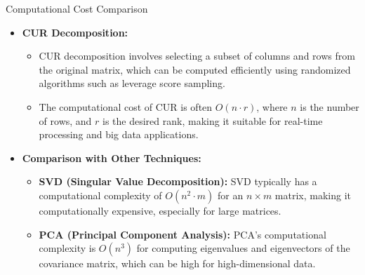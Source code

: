 \documentclass[pdf]{beamer}
\begin{document}
\begin{frame}{Computational Cost Comparison}
            \begin{itemize}
                \item \textbf{CUR Decomposition:} 
                    \begin{itemize}
                        \item CUR decomposition involves selecting a subset of columns and rows from the original matrix, which can be computed efficiently using randomized algorithms such as leverage score sampling.
                        \item The computational cost of CUR is often \(O(n \cdot r)\), where \(n\) is the number of rows, and \(r\) is the desired rank, making it suitable for real-time processing and big data applications.
                    \end{itemize}
                \item \textbf{Comparison with Other Techniques:}
                    \begin{itemize}
                        \item \textbf{SVD (Singular Value Decomposition):} SVD typically has a computational complexity of \(O(n^2 \cdot m)\) for an \(n \times m\) matrix, making it computationally expensive, especially for large matrices.
                        \item \textbf{PCA (Principal Component Analysis):} PCA's computational complexity is \(O(n^3)\) for computing eigenvalues and eigenvectors of the covariance matrix, which can be high for high-dimensional data.
                    \end{itemize}
            \end{itemize}
\end{frame}
\end{document}
